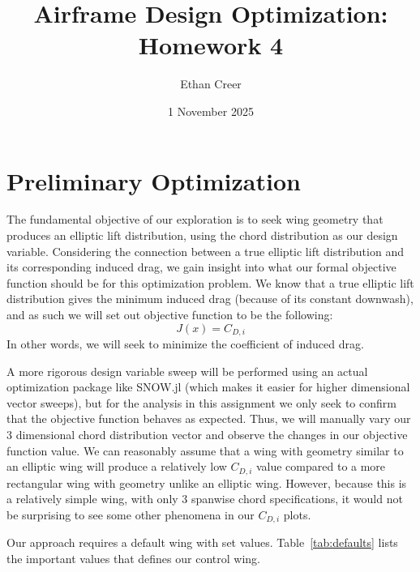 \documentclass{article}
\title{Airframe Design Optimization: Homework 4}
\author{Ethan Creer}
\date{1 November 2025}
\begin{document}
\maketitle
\section{Preliminary Optimization}
The fundamental objective of our exploration is to seek wing geometry that produces an elliptic lift distribution, using the chord distribution as our design variable.
Considering the connection between a true elliptic lift distribution and its corresponding induced drag, we gain insight into what our formal objective function should be for this optimization problem.
We know that a true elliptic lift distribution gives the minimum induced drag (because of its constant downwash), and as such we will set out objective function to be the following:
\begin{equation}\label{eq:objectiveFunction}
    J(x) = C_{D,i}
\end{equation}
In other words, we will seek to minimize the coefficient of induced drag.

A more rigorous design variable sweep will be performed using an actual optimization package like SNOW.jl (which makes it easier for higher dimensional vector sweeps), but for the analysis in this assignment we only seek to confirm that the objective function behaves as expected.
Thus, we will manually vary our 3 dimensional chord distribution vector and observe the changes in our objective function value.
We can reasonably assume that a wing with geometry similar to an elliptic wing will produce a relatively low $C_{D,i}$ value compared to a more rectangular wing with geometry unlike an elliptic wing.
However, because this is a relatively simple wing, with only 3 spanwise chord specifications, it would not be surprising to see some other phenomena in our $C_{D,i}$ plots.

Our approach requires a default wing with set values. Table~\ref{tab:defaults} lists the important values that defines our control wing.
\end{document}
